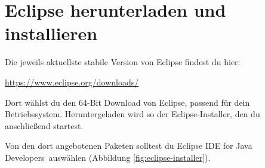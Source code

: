 % 
% 
% 
% 
% 
% 
% 

\clearpage

\section{Eclipse herunterladen und installieren}

Die jeweils aktuellste stabile Version von Eclipse findest du hier:	

\url{https://www.eclipse.org/downloads/}

Dort wählst du den 64-Bit Download von Eclipse, passend für dein Betriebssystem.
Heruntergeladen wird so der Eclipse-Installer, den du anschließend startest.

Von den dort angebotenen Paketen solltest du \glqq Eclipse IDE for Java
Developers\grqq\ auswählen (Abbildung \ref{fig:eclipse-installer}). 

